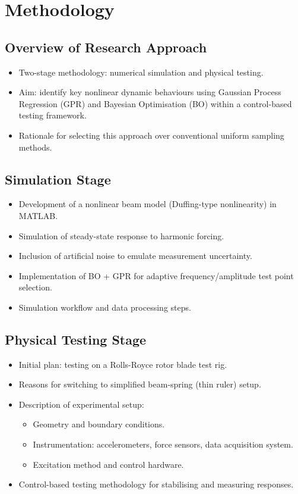 \chapter{Methodology}

\section{Overview of Research Approach}
\begin{itemize}
    \item Two-stage methodology: numerical simulation and physical testing.
    \item Aim: identify key nonlinear dynamic behaviours using Gaussian Process Regression (GPR) and Bayesian Optimisation (BO) within a control-based testing framework.
    \item Rationale for selecting this approach over conventional uniform sampling methods.
\end{itemize}

\section{Simulation Stage}
\begin{itemize}
    \item Development of a nonlinear beam model (Duffing-type nonlinearity) in MATLAB.
    \item Simulation of steady-state response to harmonic forcing.
    \item Inclusion of artificial noise to emulate measurement uncertainty.
    \item Implementation of BO + GPR for adaptive frequency/amplitude test point selection.
    \item Simulation workflow and data processing steps.
\end{itemize}

\section{Physical Testing Stage}
\begin{itemize}
    \item Initial plan: testing on a Rolls-Royce rotor blade test rig.
    \item Reasons for switching to simplified beam-spring (thin ruler) setup.
    \item Description of experimental setup:
    \begin{itemize}
        \item Geometry and boundary conditions.
        \item Instrumentation: accelerometers, force sensors, data acquisition system.
        \item Excitation method and control hardware.
    \end{itemize}
    \item Control-based testing methodology for stabilising and measuring responses.
\end{itemize}

